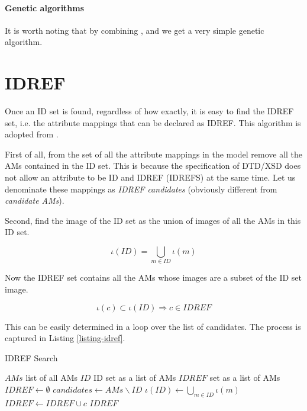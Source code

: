 \paragraph{Genetic algorithms}

It is worth noting that by combining ,  and  we get a very simple genetic algorithm.

\section{IDREF}

Once an ID set is found, regardless of how exactly, it is easy to find the IDREF set, i.e. the attribute mappings that can be declared as IDREF. This algorithm is adopted from \cite{fidax}.

First of all, from the set of all the attribute mappings in the model remove all the AMs contained in the ID set. This is because the specification of DTD/XSD does not allow an attribute to be ID and IDREF (IDREFS) at the same time. Let us denominate these mappings as \textit{IDREF candidates} (obviously different from \textit{candidate AMs}).

Second, find the image of the ID set as the union of images of all the AMs in this ID set.

\[\iota(ID) = \bigcup_{m \in ID} \iota(m)\]

Now the IDREF set contains all the AMs whose images are a subset of the ID set image.

\[\iota(c) \subset \iota(ID) \Rightarrow c \in IDREF\]

This can be easily determined in a loop over the list of candidates. The process is captured in Listing \ref{listing-idref}.

\begin{algorithm}
\caption{IDREF Search}
\label{listing-idref}
\begin{algorithmic}
\REQUIRE $AMs$ list of all AMs
\REQUIRE $ID$ ID set as a list of AMs
\ENSURE $IDREF$ set as a list of AMs
\STATE $IDREF \gets \emptyset$
\STATE $candidates \gets AMs \backslash ID$
\STATE $\iota(ID) \gets \bigcup_{m \in ID} \iota(m)$
    \STATE $IDREF \gets IDREF \cup c$
  \ENDIF
\ENDFOR
\RETURN $IDREF$
\end{algorithmic}
\end{algorithm}
